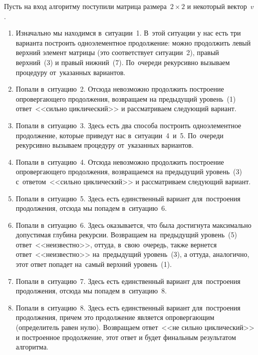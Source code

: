 Пусть на вход алгоритму поступили матрица размера~$2 \times 2$ и некоторый вектор~$v$.
\begin{enumerate}
    \item
        Изначально мы находимся в~ситуации~1.
        В~этой ситуации у нас есть три варианта построить одноэлементное продолжение:
        можно продолжить левый верхний элемент матрицы (это соответствует ситуации~2),
        правый верхний~(3) и правый нижний~(7).
        По~очереди рекурсивно вызываем процедуру от~указанных вариантов.
    \item
        Попали в~ситуацию~2. Отсюда невозможно продолжить построение опровергающего продолжения,
        возвращаем на предыдущий уровень~(1) ответ~<<сильно циклический>> и рассматриваем следующий вариант.
    \item
        Попали в~ситуацию~3. Здесь есть два способа построить одноэлементное продолжение,
        которые приведут нас в~ситуации~4~и~5.
        По~очереди рекурсивно вызываем процедуру от~указанных вариантов.
    \item
        Попали в~ситуацию~4. Отсюда невозможно продолжить построение опровергающего продолжения,
        возвращаемся на предыдущий уровень~(3) с~ответом~<<сильно циклический>> и рассматриваем следующий вариант.
    \item
        Попали в~ситуацию~5. Здесь есть единственный вариант для~построения продолжения,
        отсюда мы попадем в~ситуацию~6.
    \item
        Попали в~ситуацию~6. Здесь оказывается, что была достигнута максимально допустимая глубина рекурсии.
        Возвращаем на~предыдущий уровень~(5) ответ~<<неизвестно>>,
        оттуда, в~свою~очередь, также вернется ответ~<<неизвестно>> на~предыдущий уровень~(3),
        а оттуда, аналогично, этот ответ попадет на~самый верхний уровень~(1).
    \item
        Попали в~ситуацию~7. Здесь есть единственный вариант для~построения продолжения,
        отсюда мы попадем в~ситуацию~8.
    \item
        Попали в~ситуацию~8. Здесь есть единственный вариант для~построения продолжения,
        причем это продолжение является опровергающим (определитель равен нулю).
        Возвращаем ответ~<<не сильно циклический>> и построенное продолжение,
        этот ответ и будет финальным результатом алгоритма.
\end{enumerate}
